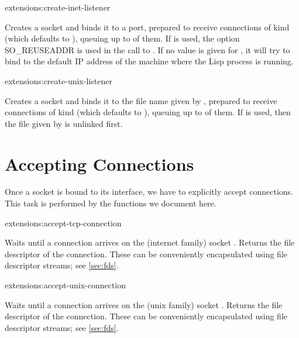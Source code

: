\begin{defun}{extensions:}{create-inet-listener}{%
    }
                     
  Creates a socket and binds it to a port, prepared to receive
  connections of kind  (which defaults to ),
  queuing up to  of them. If  
  is used, the option SO\_REUSEADDR is used in the call to .
  If no value is given for , it will try to bind to the
  default IP address of the machine where the Lisp process is running.

\end{defun}

\begin{defun}{extensions:}{create-unix-listener}{%
    }
  
  Creates a socket and binds it to the file name given by ,
  prepared to receive connections of kind  (which defaults
  to ), queuing up to  of them. If
    is used, then the file given by
   is unlinked first.

\end{defun}

\section{Accepting Connections}

Once a socket is bound to its interface, we have to explicitly accept
connections. This task is performed by the functions we document here.

\begin{defun}{extensions:}{accept-tcp-connection}{%
    }
  
  Waits until a connection arrives on the (internet family) socket
  . Returns the file descriptor of the connection.
  These can be conveniently encapsulated using file descriptor
  streams; see \ref{sec:fds}.

\end{defun}

\begin{defun}{extensions:}{accept-unix-connection}{%
    }

  Waits until a connection arrives on the (unix family) socket
  . Returns the file descriptor of the connection.
  These can be conveniently encapsulated using file descriptor
  streams; see \ref{sec:fds}.

\end{defun}

